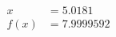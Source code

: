 \documentclass[preview]{standalone}
\begin{document}
\begin{align*}
x &= 5.0181\\f(x) &= 7.9999592
\end{align*}
\end{document}
